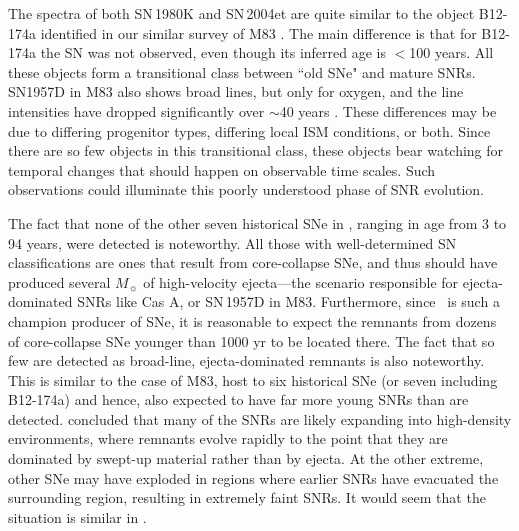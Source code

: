 
The spectra of both SN\,1980K and SN\,2004et are quite  similar to the object B12-174a identified in our similar survey of M83 \citep{blair15}. The main difference is that for B12-174a the SN was not observed, even though its inferred age is $<$100 years.  All these objects form a transitional class between ``old SNe" and mature SNRs.  SN1957D in M83 also shows broad lines, but only for oxygen, and the line intensities have dropped significantly over $\sim$40 years \citep[][and references therein]{long12}.  These differences may be due to differing progenitor types, differing local ISM conditions, or both.  \citep[The \oiii\ lines would appear relatively stronger in both  SN\,1980K and SN\,2004et if these were dereddened, with $E(B-V) = 0.41$,][but even so they would not be nearly so O-dominated as SN\,1957D.]{fesen99b, sahu06} Since there are so few objects in this transitional class, these objects bear watching for temporal changes that should happen on observable time scales.  Such observations could illuminate this poorly understood phase of SNR evolution.

The fact that none of the other seven historical SNe in \gal, ranging in age from 3 to 94 years, were detected is noteworthy.  All those with well-determined SN classifications are ones that result from core-collapse SNe, and thus should have produced several $M_{\sun}$ of high-velocity ejecta---the scenario responsible for ejecta-dominated SNRs like Cas A, or SN\,1957D in M83.  Furthermore, since \gal\ is such a champion producer of SNe, it is reasonable to expect the remnants from dozens of core-collapse SNe younger than 1000 yr to be located there.  The fact that so few are detected as broad-line, ejecta-dominated remnants is also noteworthy.   This is similar to the case of M83, host to six historical SNe (or seven including B12-174a) and hence, also expected to have far more young SNRs than are detected.  \citet{winkler17} concluded that many of the SNRs are likely expanding into high-density environments, where remnants evolve rapidly to the point that they are dominated by swept-up material rather than by ejecta. At the other extreme, other SNe may have exploded in regions where earlier SNRs have evacuated the surrounding region, resulting in extremely faint SNRs.  It would seem that the situation is similar in \gal.


